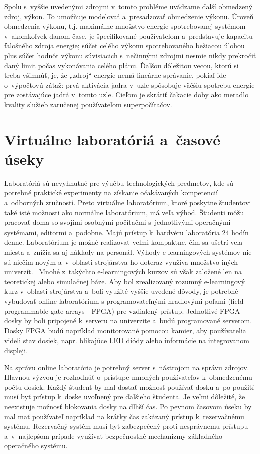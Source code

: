 Spolu s~vyššie uvedenými zdrojmi v~tomto probléme uvádzame ďalší obmedzený zdroj, výkon. To umožňuje modelovať a~presadzovať obmedzenie výkonu. Úroveň obmedzenia výkonu, t.j. maximálne množstvo energie spotrebovanej systémom v~akomkoľvek danom čase, je špecifikované používateľom a~predstavuje kapacitu falošného zdroja energie; súčet celého výkonu spotrebovaného bežiacou úlohou plus súčet hodnôt výkonu súvisiacich s~nečinnými zdrojmi nesmie nikdy prekročiť daný limit počas vykonávania celého plánu. Ďalšou dôležitou vecou, ktorú si treba všimnúť, je, že „zdroj“ energie nemá lineárne správanie, pokiaľ ide o~výpočtovú záťaž: prvá aktivácia jadra v~uzle spôsobuje väčšiu spotrebu energie pre zostávajúce jadrá v~tomto uzle. Cieľom je skrátiť čakacie doby ako meradlo kvality služieb zaručenej používateľom superpočítačov.~\cite{BorghesiAndrea2015PCiH}

\section{Virtuálne laboratóriá a~časové úseky}

Laboratóriá sú nevyhnutné pre výučbu technologických predmetov, kde sú potrebné praktické experimenty na získanie očakávaných kompetencií a~odborných zručností. Preto virtuálne laboratórium, ktoré poskytne študentovi také isté možnosti ako normálne laboratórium, má veľa výhod. Študenti môžu pracovať doma so svojimi osobnými počítačmi s~jednotlivými operačnými systémami, editormi a~podobne. Majú prístup k~hardvéru laboratória 24 hodín denne. Laboratórium je možné realizovať veľmi kompaktne, čím sa ušetrí veľa miesta a~znížia sa aj náklady na personál. Výhody e-learningových systémov nie sú niečím novým a~v~oblasti strojárstva ho doteraz využíva množstvo iných univerzít.~\cite{reichenbach2011new, monzo2021remote}
Mnohé z~takýchto e-learningových kurzov sú však založené len na teoretickej alebo simulačnej báze. Aby bol zrealizovaný rozumný e-learningový kurz v~oblasti strojárstva a~boli využité vyššie uvedené dôvody, je potrebné vybudovať online laboratórium s programovateľnými hradlovými poľami (field programmable gate arrays - FPGA) pre vzdialený prístup. Jednotlivé FPGA dosky by boli pripojené k~serveru na univerzite a~budú programované serverom. Dosky FPGA budú napríklad monitorované pomocou kamier, aby používatelia videli stav dosiek, napr. blikajúce LED diódy alebo informácie na integrovanom displeji.~\cite{reichenbach2011new}

Na správu online laboratória je potrebný server s~nástrojom na správu zdrojov. Hlavnou výzvou je rozhodnúť o~prístupe mnohých používateľov k~obmedzenému počtu dosiek. Každý študent by mal dostať možnosť používať dosku a~po použití musí byť prístup k~doske uvoľnený pre ďalšieho študenta. Je veľmi dôležité, že neexistuje možnosť blokovania dosky na dlhší čas. Po pevnom časovom úseku by mal mať používateľ napríklad na krátky čas zakázaný prístup k~rezervačnému systému. Rezervačný systém musí byť zabezpečený proti nesprávnemu prístupu a~v~najlepšom prípade využívať bezpečnostné mechanizmy základného operačného systému.~\cite{reichenbach2011new}

